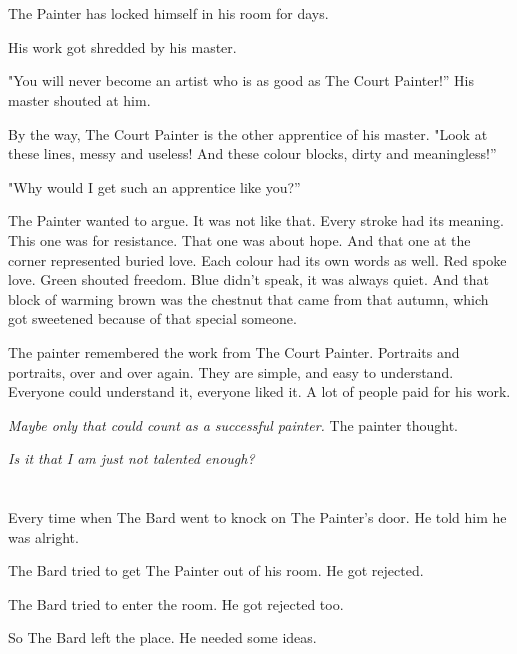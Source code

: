 \documentclass{article}
\begin{document}
\section{} %
\par The Painter has locked himself in his room for days.
\par His work got shredded by his master.
\par "You will never become an artist who is as good as The Court Painter!” His master shouted at him.
\par By the way, The Court Painter is the other apprentice of his master.
"Look at these lines, messy and useless! And these colour blocks, dirty and meaningless!”
\par "Why would I get such an apprentice like you?”
\par The Painter wanted to argue. It was not like that. Every stroke had its meaning. This one was for resistance. That one was about hope. And that one at the corner represented buried love. Each colour had its own words as well. Red spoke love. Green shouted freedom. Blue didn't speak, it was always quiet. And that block of warming brown was the chestnut that came from that autumn, which got sweetened because of that special someone.
\par The painter remembered the work from The Court Painter. Portraits and portraits, over and over again. They are simple, and easy to understand. Everyone could understand it, everyone liked it. A lot of people paid for his work.
\par \textit{Maybe only that could count as a successful painter.} The painter thought.
\par \textit{Is it that I am just not talented enough?}

\section{}%
\par Every time when The Bard went to knock on The Painter's door. He told him he was alright.
\par The Bard tried to get The Painter out of his room. He got rejected.
\par The Bard tried to enter the room. He got rejected too.
\par So The Bard left the place. He needed some ideas.
\end{document}
